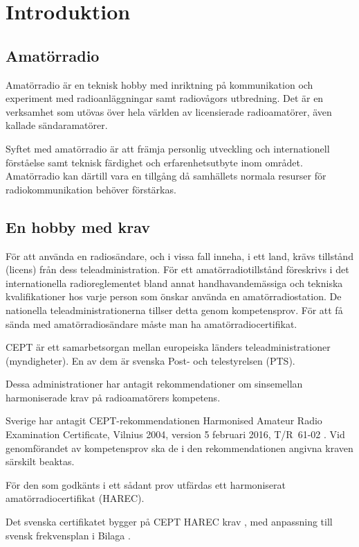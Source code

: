 \chapter*{Introduktion}

\section*{Amatörradio}

Amatörradio är en teknisk hobby med inriktning på kommunikation och experiment
med radioanläggningar samt radiovågors utbredning. Det är en verksamhet som
utövas över hela världen av licensierade radioamatörer, även kallade
sändaramatörer.

Syftet med amatörradio är att främja personlig utveckling och internationell
förståelse samt teknisk färdighet och erfarenhetsutbyte inom området.
Amatörradio kan därtill vara en tillgång då samhällets normala resurser för
radiokommunikation behöver förstärkas.

\section*{En hobby med krav}

För att använda en radiosändare, och i vissa fall inneha, i ett land, krävs
tillstånd (licens) från dess teleadministration.
För ett amatörradiotillstånd föreskrivs i det internationella radioreglementet
\cite{ITU-RR} bland annat handhavandemässiga och tekniska kvalifikationer hos
varje person som önskar använda en amatörradiostation.
De nationella teleadministrationerna tillser detta genom kompetensprov.
För att få sända med amatörradiosändare måste man ha amatörradiocertifikat.

CEPT är ett samarbetsorgan mellan europeiska länders teleadministrationer
(myndigheter).
En av dem är svenska Post- och telestyrelsen (PTS).

Dessa administrationer har antagit rekommendationer om sinsemellan
harmoniserade krav på radioamatörers kompetens.

Sverige har antagit CEPT-rekom\-men\-da\-ti\-on\-en
 Ha\-rmonised Amateur Radio Examination
Certificate, Vilnius 2004, version 5 februari 2016, T/R~61-02 \cite{TR6102}.
Vid genomförandet av kompetensprov ska de i den rekommendationen
angivna kraven särskilt beaktas.

För den som godkänts i ett sådant prov utfärdas ett harmoniserat
amatörradiocertifikat (HAREC).

Det svenska certifikatet bygger på CEPT HAREC krav \cite{TR6102},
med anpassning till svensk frekvensplan i Bilaga .


